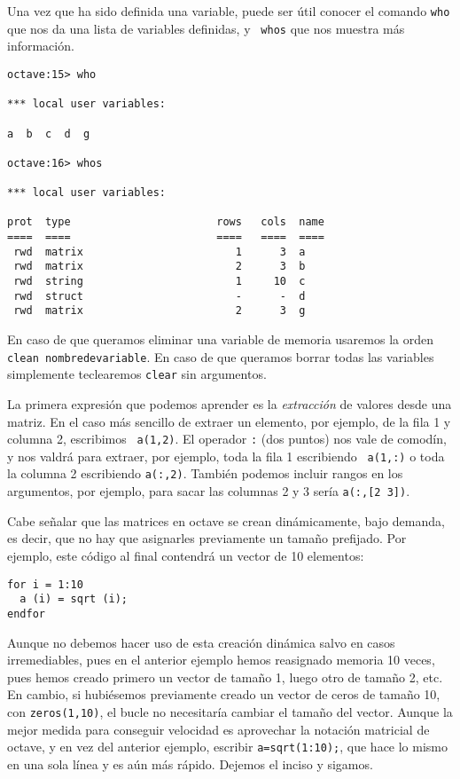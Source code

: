 Una vez que  ha sido definida una variable, puede  ser útil conocer el
comando {\tt who} que nos da  una lista de variables definidas, y {\tt
whos} que nos muestra más información.

\begin{verbatim}
octave:15> who 

*** local user variables:

a  b  c  d  g

octave:16> whos

*** local user variables:

prot  type                       rows   cols  name
====  ====                       ====   ====  ====
 rwd  matrix                        1      3  a
 rwd  matrix                        2      3  b
 rwd  string                        1     10  c
 rwd  struct                        -      -  d
 rwd  matrix                        2      3  g
\end{verbatim}

En  caso de  que queramos  eliminar una  variable de  memoria usaremos
la  orden  {\tt  clean  nombredevariable}. En  caso  de  que  queramos
borrar  todas las  variables simplemente  teclearemos {\tt  clear} sin
argumentos.

La primera  expresión que podemos  aprender es la {\em  extracción} de
valores  desde una  matriz.  En el  caso más  sencillo  de extraer  un
elemento,  por ejemplo,  de la  fila 1  y columna  2, escribimos  {\tt
a(1,2)}. El operador \verb|:| (dos puntos)  nos vale de comodín, y nos
valdrá  para extraer,  por ejemplo,  toda la  fila 1  escribiendo {\tt
a(1,:)} o toda la columna  2 escribiendo {\tt a(:,2)}. También podemos
incluir rangos en los argumentos, por ejemplo, para sacar las columnas
2 y 3 sería {\tt a(:,[2 3])}.

Cabe señalar que  las matrices en octave se  crean dinámicamente, bajo
demanda, es  decir, que  no hay que  asignarles previamente  un tamaño
prefijado. Por ejemplo, este código al final contendrá un vector de 10
elementos:

\begin{verbatim}
for i = 1:10
  a (i) = sqrt (i);
endfor
\end{verbatim}

Aunque no debemos  hacer uso de esta creación dinámica  salvo en casos
irremediables, pues en el anterior ejemplo hemos reasignado memoria 10
veces, pues hemos creado primero un  vector de tamaño 1, luego otro de
tamaño 2, etc.  En cambio, si hubiésemos previamente  creado un vector
de ceros de tamaño 10, con  {\tt zeros(1,10)}, el bucle no necesitaría
cambiar el  tamaño del vector.  Aunque la mejor medida  para conseguir
velocidad es aprovechar la notación matricial  de octave, y en vez del
anterior ejemplo, escribir  {\tt a=sqrt(1:10);}, que hace  lo mismo en
una sola línea y es aún más rápido. Dejemos el inciso y sigamos.

